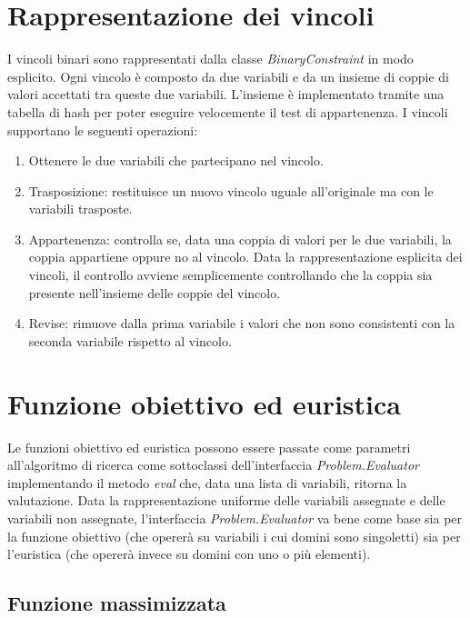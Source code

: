\documentclass[a4paper,12pt,italian]{article}
\begin{document}
\section{Rappresentazione dei vincoli}

I vincoli binari sono rappresentati dalla classe
\textit{BinaryConstraint} in modo esplicito. Ogni vincolo \`e composto
da due variabili e da un insieme di coppie di valori accettati tra
queste due variabili. L'insieme \`e implementato tramite una tabella
di hash per poter eseguire velocemente il test di appartenenza. I
vincoli supportano le seguenti operazioni:

\begin{enumerate}
\item Ottenere le due variabili che partecipano nel vincolo.
\item Trasposizione: restituisce un nuovo vincolo uguale all'originale
  ma con le variabili trasposte.
\item Appartenenza: controlla se, data una coppia di valori per le due variabili, la
  coppia appartiene oppure no al vincolo. Data la rappresentazione
  esplicita dei vincoli, il controllo avviene semplicemente
  controllando che la coppia sia presente nell'insieme delle coppie
  del vincolo.
\item Revise: rimuove dalla prima variabile i valori che non sono
  consistenti con la seconda variabile rispetto al vincolo.
\end{enumerate}

\section{Funzione obiettivo ed euristica}

Le funzioni obiettivo ed euristica possono essere passate come
parametri all'algoritmo di ricerca come sottoclassi dell'interfaccia
\textit{Problem.Evaluator} implementando il metodo \textit{eval} che,
data una lista di variabili, ritorna la valutazione. Data la
rappresentazione uniforme delle variabili assegnate e delle variabili
non assegnate, l'interfaccia \textit{Problem.Evaluator} va bene come
base sia per la funzione obiettivo (che operer\`a su variabili i cui
domini sono singoletti) sia per l'euristica (che operer\`a invece su
domini con uno o pi\`u elementi).

\subsection{Funzione massimizzata}
\end{document}
